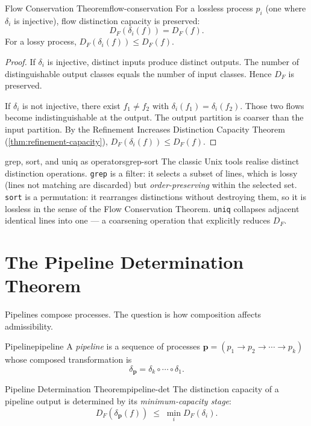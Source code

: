 \documentclass[12pt,twoside,openright]{book}
\newcommand{\csicon} {\marginpar{\tiny\color{DistBlue}\faCode}}
\begin{document}
\begin{theorem}{Flow Conservation Theorem}{flow-conservation}
  For a lossless process $p_i$ (one where $\delta_i$ is
  injective), flow distinction capacity is preserved:
  \[
    D_F(\delta_i(f)) = D_F(f).
  \]
  For a lossy process, $D_F(\delta_i(f)) \le D_F(f)$.
\end{theorem}

\begin{proof}
  If $\delta_i$ is injective, distinct inputs produce
  distinct outputs. The number of distinguishable output
  classes equals the number of input classes.
  Hence $D_F$ is preserved.

  If $\delta_i$ is not injective, there exist
  $f_1 \ne f_2$ with $\delta_i(f_1) = \delta_i(f_2)$.
  Those two flows become indistinguishable at the output.
  The output partition is coarser than the input partition.
  By the Refinement Increases Distinction Capacity Theorem
  (\cref{thm:refinement-capacity}),
  $D_F(\delta_i(f)) \le D_F(f)$.
\end{proof}

\begin{remark}{grep, sort, and uniq as operators}{grep-sort}
  \csicon
  The classic Unix tools realise distinct distinction
  operations. \texttt{grep} is a filter: it selects a
  subset of lines, which is lossy (lines not matching are
  discarded) but \emph{order-preserving} within the
  selected set. \texttt{sort} is a permutation: it
  rearranges distinctions without destroying them, so it
  is lossless in the sense of the Flow Conservation
  Theorem. \texttt{uniq} collapses adjacent identical
  lines into one — a coarsening operation that explicitly
  reduces $D_F$.
\end{remark}

\section{The Pipeline Determination Theorem}

Pipelines compose processes. The question is how
composition affects admissibility.

\begin{definition}{Pipeline}{pipeline}
  A \emph{pipeline} is a sequence of processes
  $\mathbf{p} = (p_1 \to p_2 \to \cdots \to p_k)$
  whose composed transformation is
  \[
    \delta_\mathbf{p} = \delta_k \circ \cdots \circ \delta_1.
  \]
\end{definition}

\begin{theorem}{Pipeline Determination Theorem}{pipeline-det}
  The distinction capacity of a pipeline output is
  determined by its \emph{minimum-capacity stage}:
  \[
    D_F(\delta_\mathbf{p}(f))
    \;\le\;
    \min_{i} D_F(\delta_i).
  \]
\end{theorem}
\end{document}
